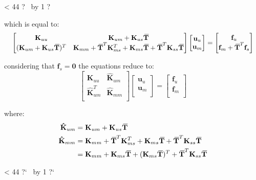\documentclass[10pt,b5paper,titlepage]{book}
\newcommand{\m}{\mathbf}
\newcommand{\closure}[2][3]{%
{}\mkern#1mu\overline{\mkern-#1mu#2}}
\newcommand{\repeatit}[3][10]{%
    \myloopcounter1%
    \loop\ifnum\myloopcounter < #1
    #2#3%
    \advance\myloopcounter by 1%
    \repeat%
    #2%
}
\newenvironment{qbox}
{
\begin{center}
    \repeatit[44]{?}{\ }
\end{center}
}
{
\begin{center}
    \repeatit[44]{?`}{\ }
\end{center}
}
\newenvironment{eqarray}
{
    \begin{eqnarray}
        \begin{aligned}
}
{
        \end{aligned}
    \end{eqnarray}
}
\begin{document}
\begin{qbox}
    which is equal to:
    \begin{equation}
        \scalebox{0.95}{
        $ \begin{bmatrix}
            \m{K}_{uu} & \m{K}_{um} + \m{K}_{us} \m{\closure{T}} \\
            (\m{K}_{um} + \m{K}_{us} \m{\closure{T}})^T &
            \m{K}_{mm} + \m{\closure{T}}^T \m{K}_{ms}^T +
            \m{K}_{ms} \m{\closure{T}} + \m{\closure{T}}^T \m{K}_{ss} \m{\closure{T}} \\
        \end{bmatrix}
        \begin{bmatrix}
            \m{u}_u \\
            \m{u}_m \\
        \end{bmatrix}
        = \begin{bmatrix}
            \m{f}_u \\
            \m{f}_m + \m{\closure{T}}^T \m{f}_s \\
        \end{bmatrix} $
        }
    \end{equation}

    considering that $ \m{f}_s = \m{0} $ the equations reduce to:
    \begin{equation}
        \begin{bmatrix}
            \m{K}_{uu} & \m{\hat{K}}_{um} \\
            \m{\hat{K}}_{um}^T & \m{\hat{K}}_{mm} \\
        \end{bmatrix}
        \begin{bmatrix}
            \m{u}_u \\
            \m{u}_m \\
        \end{bmatrix}
        = \begin{bmatrix}
            \m{f}_u \\
            \m{f}_m \\
        \end{bmatrix}
    \end{equation}

    where:
    \begin{eqarray}
        \m{\hat{K}}_{um} &= \m{K}_{um} + \m{K}_{us} \m{\closure{T}} \\
        \m{\hat{K}}_{mm} &= \m{K}_{mm} + \m{\closure{T}}^T \m{K}_{ms}^T
                          + \m{K}_{ms} \m{\closure{T}}
                          + \m{\closure{T}}^T \m{K}_{ss} \m{\closure{T}} \\
                         &= \m{K}_{mm} + \m{K}_{ms} \m{\closure{T}}
                          + (\m{K}_{ms} \m{\closure{T}})^T
                          + \m{\closure{T}}^T \m{K}_{ss} \m{\closure{T}}
    \end{eqarray}

\end{qbox}
\end{document}
